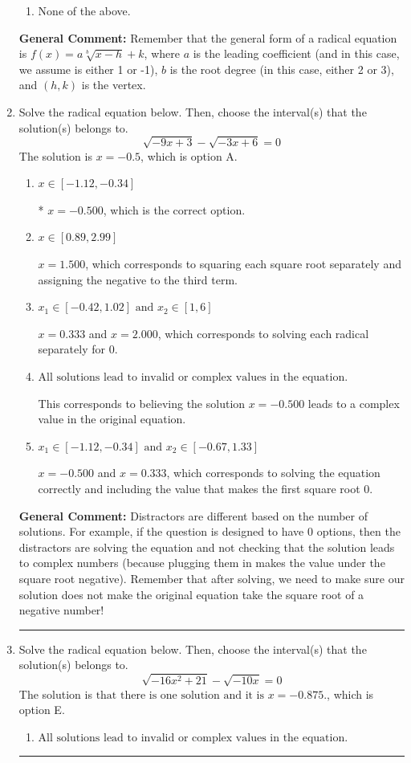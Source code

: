 \documentclass{extbook}[14pt]
\newcommand{\litem}[1]{\item #1

\rule{\textwidth}{0.4pt}}
\begin{document}
\begin{enumerate}
{\begin{enumerate}[label=\Alph*.]
\begin{multicols}{2}
\end{multicols}\item None of the above.\end{enumerate}
\textbf{General Comment:} Remember that the general form of a radical equation is $ f(x) = a \sqrt[b]{x - h} + k $, where $a$ is the leading coefficient (and in this case, we assume is either 1 or -1), $b$ is the root degree (in this case, either 2 or 3), and $(h, k)$ is the vertex.
}
\litem{
Solve the radical equation below. Then, choose the interval(s) that the solution(s) belongs to.
\[ \sqrt{-9 x + 3} - \sqrt{-3 x + 6} = 0 \]The solution is \( x = -0.5 \), which is option A.\begin{enumerate}[label=\Alph*.]
\item \( x \in [-1.12,-0.34] \)

* $x = -0.500$, which is the correct option.
\item \( x \in [0.89,2.99] \)

$x = 1.500$, which corresponds to squaring each square root separately and assigning the negative to the third term.
\item \( x_1 \in [-0.42, 1.02] \text{ and } x_2 \in [1,6] \)

$x = 0.333$ and $x = 2.000$, which corresponds to solving each radical separately for 0.
\item \( \text{All solutions lead to invalid or complex values in the equation.} \)

This corresponds to believing the solution $x = -0.500$ leads to a complex value in the original equation.
\item \( x_1 \in [-1.12, -0.34] \text{ and } x_2 \in [-0.67,1.33] \)

$x = -0.500$ and $x = 0.333$, which corresponds to solving the equation correctly and including the value that makes the first square root 0.
\end{enumerate}

\textbf{General Comment:} Distractors are different based on the number of solutions. For example, if the question is designed to have 0 options, then the distractors are solving the equation and not checking that the solution leads to complex numbers (because plugging them in makes the value under the square root negative). Remember that after solving, we need to make sure our solution does not make the original equation take the square root of a negative number!
}
\litem{
Solve the radical equation below. Then, choose the interval(s) that the solution(s) belongs to.
\[ \sqrt{-16 x^2 + 21} - \sqrt{-10 x} = 0 \]The solution is \( \text{that there is one solution and it is } x = -0.875. \), which is option E.\begin{enumerate}[label=\Alph*.]
\item \( \text{All solutions lead to invalid or complex values in the equation.} \)


\end{enumerate}}
\end{enumerate}
\end{document}
